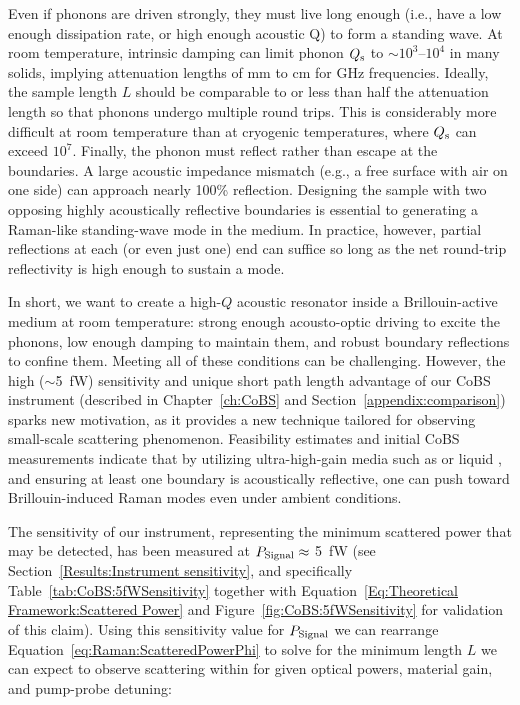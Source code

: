 Even if phonons are driven strongly, they must live long enough (i.e., have a low enough dissipation rate, or high enough acoustic Q) to form a standing wave. At room temperature, intrinsic damping can limit phonon \(Q_{\rm s}\) to \(\sim10^{3}\)–\(10^{4}\) in many solids, \cite{heiman1979brillouin, bucaro1974high} implying attenuation lengths of \si{\milli\meter} to \si{\centi\meter} for \si{\giga\hertz} frequencies. Ideally, the sample length \(L\) should be comparable to or less than half the attenuation length so that phonons undergo multiple round trips. This is considerably more difficult at room temperature than at cryogenic temperatures, where \(Q_{\rm s}\) can exceed \(10^{7}\). \cite{maris1990phonon, renninger2018bulk} Finally, the phonon must reflect rather than escape at the boundaries. A large acoustic impedance mismatch (e.g., a free surface with air on one side) can approach nearly 100\% reflection. \cite{galliou2013extremely, auld1973acoustic} Designing the sample with two opposing highly acoustically reflective boundaries is essential to generating a Raman-like standing-wave mode in the medium. In practice, however, partial reflections at each (or even just one) end can suffice so long as the net round‐trip reflectivity is high enough to sustain a mode.

In short, we want to create a high-\(Q\) acoustic resonator inside a Brillouin-active medium at room temperature: strong enough acousto-optic driving to excite the phonons, low enough damping to maintain them, and robust boundary reflections to confine them. Meeting all of these conditions can be challenging. However, the high (\(\sim\)\SI{5}{\femto\watt}) sensitivity and unique short path length advantage of our \ac{CoBS} instrument (described in Chapter~\ref{ch:CoBS} and Section~\ref{appendix:comparison}) sparks new motivation, as it provides a new technique tailored for observing small-scale scattering phenomenon. Feasibility estimates and initial \ac{CoBS} measurements indicate that by utilizing ultra-high-gain media such as  \cite{sanghera2010nonlinear, abedin2005observation} or liquid  \cite{boyd2020nonlinear}, and ensuring at least one boundary is acoustically reflective, one can push toward Brillouin-induced Raman modes even under ambient conditions.

The sensitivity of our instrument, representing the minimum scattered power that may be detected, has been measured at \(P_{\rm Signal}\approx\) \SI{5}{\femto\watt} (see Section~\ref{Results:Instrument sensitivity}, and specifically Table~\ref{tab:CoBS:5fWSensitivity} together with Equation~\ref{Eq:Theoretical Framework:Scattered Power} and Figure~\ref{fig:CoBS:5fWSensitivity} for validation of this claim). Using this sensitivity value for \(P_{\rm Signal}\) we can rearrange Equation~\ref{eq:Raman:ScatteredPowerPhi} to solve for the minimum length \(L\) we can expect to observe scattering within for given optical powers, material gain, and pump-probe detuning:

